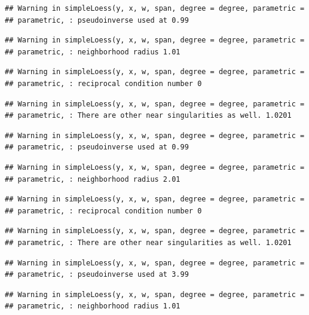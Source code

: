 \documentclass[
]{article}
\begin{document}
\begin{verbatim}
## Warning in simpleLoess(y, x, w, span, degree = degree, parametric =
## parametric, : pseudoinverse used at 0.99
\end{verbatim}

\begin{verbatim}
## Warning in simpleLoess(y, x, w, span, degree = degree, parametric =
## parametric, : neighborhood radius 1.01
\end{verbatim}

\begin{verbatim}
## Warning in simpleLoess(y, x, w, span, degree = degree, parametric =
## parametric, : reciprocal condition number 0
\end{verbatim}

\begin{verbatim}
## Warning in simpleLoess(y, x, w, span, degree = degree, parametric =
## parametric, : There are other near singularities as well. 1.0201
\end{verbatim}

\begin{verbatim}
## Warning in simpleLoess(y, x, w, span, degree = degree, parametric =
## parametric, : pseudoinverse used at 0.99
\end{verbatim}

\begin{verbatim}
## Warning in simpleLoess(y, x, w, span, degree = degree, parametric =
## parametric, : neighborhood radius 2.01
\end{verbatim}

\begin{verbatim}
## Warning in simpleLoess(y, x, w, span, degree = degree, parametric =
## parametric, : reciprocal condition number 0
\end{verbatim}

\begin{verbatim}
## Warning in simpleLoess(y, x, w, span, degree = degree, parametric =
## parametric, : There are other near singularities as well. 1.0201
\end{verbatim}

\begin{verbatim}
## Warning in simpleLoess(y, x, w, span, degree = degree, parametric =
## parametric, : pseudoinverse used at 3.99
\end{verbatim}

\begin{verbatim}
## Warning in simpleLoess(y, x, w, span, degree = degree, parametric =
## parametric, : neighborhood radius 1.01
\end{verbatim}
\end{document}
